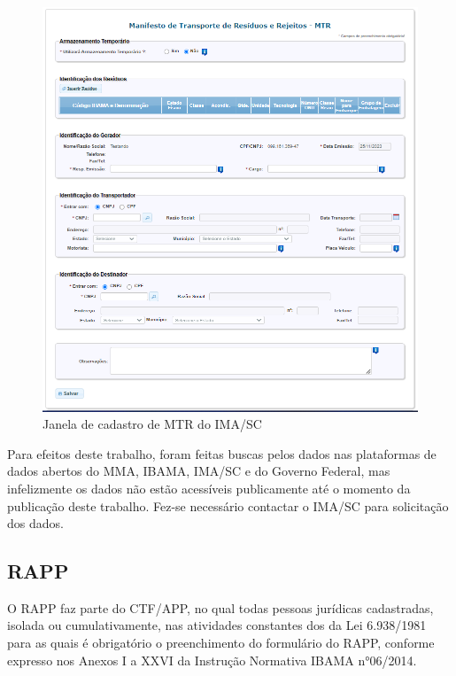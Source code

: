 \begin{figure}[htb]
	\caption{\label{fig:envio-mtr} Janela de cadastro de \gls{MTR} do \gls{IMA/SC} }
	\begin{center}
		\includegraphics[scale=0.6]{images/envio-mtr.png}
	\end{center}
\end{figure}

Para efeitos deste trabalho, foram feitas buscas pelos dados nas plataformas de dados abertos do \gls{MMA}, \gls{IBAMA}, \gls{IMA/SC} e do Governo Federal, mas infelizmente os dados não estão acessíveis publicamente até o momento da publicação deste trabalho. Fez-se necessário contactar o \gls{IMA/SC} para solicitação dos dados.



\subsection{RAPP}

O \gls{RAPP} faz parte do \gls{CTF/APP}, no qual todas pessoas jurídicas cadastradas, isolada ou cumulativamente, nas atividades constantes dos da Lei 6.938/1981 para as quais é obrigatório o preenchimento do formulário do \gls{RAPP}, conforme expresso nos Anexos I a XXVI da Instrução Normativa IBAMA n°06/2014. 

